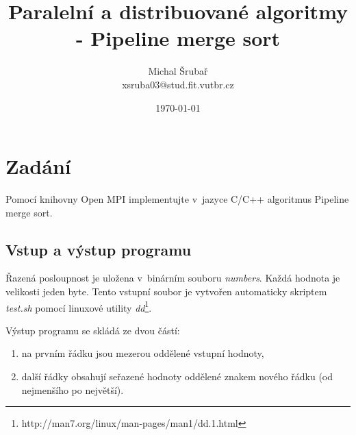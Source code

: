 \documentclass[10pt,a4paper,notitlepage]{article}
\author{Michal Šrubař\\xsruba03@stud.fit.vutbr.cz}
\date{\today}
\title{Paralelní a distribuované algoritmy - Pipeline merge sort}
\begin{document}
\maketitle

\section{Zadání}
Pomocí knihovny Open MPI implementujte v~jazyce C/C++ algoritmus Pipeline merge
sort.

\subsection{Vstup a výstup programu}
Řazená posloupnost je uložena v~binárním souboru \textit{numbers}. Každá hodnota
je velikosti jeden byte. Tento vstupní soubor je vytvořen automaticky skriptem
\textit{test.sh} pomocí linuxové utility
\textit{dd}\footnote{http://man7.org/linux/man-pages/man1/dd.1.html}.

Výstup programu se skládá ze dvou částí:
\begin{enumerate}
  \item na prvním řádku jsou mezerou oddělené vstupní hodnoty,
  \item další řádky obsahují seřazené hodnoty oddělené znakem nového řádku (od nejmenšího po největší).
\end{enumerate}


\end{document}
